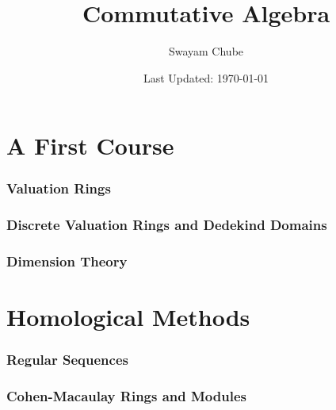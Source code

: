 \documentclass[11pt]{article}
\title{Commutative Algebra}
\author{Swayam Chube}
\date{Last Updated: \today}
\theoremstyle{thmstyle}
\theoremstyle{defstyle}
\begin{document}
\maketitle

\part{A First Course}

\section{Valuation Rings}


\section{Discrete Valuation Rings and Dedekind Domains}


\section{Dimension Theory}


\newpage
\part{Homological Methods}

\section{Regular Sequences}


\section{Cohen-Macaulay Rings and Modules}

\end{document}

